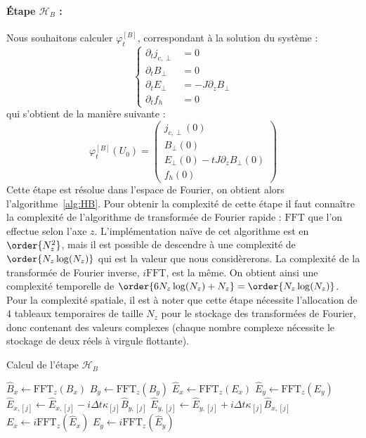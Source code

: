 \paragraph{Étape $\mathcal{H}_B$ :}
Nous souhaitons calculer $\varphi_t^{[B]}$, correspondant à la solution du système :
$$
  \begin{cases}
    \partial_t j_{c,\perp} &= 0 \\
    \partial_t B_\perp     &= 0 \\
    \partial_t E_\perp     &= -J\partial_zB_\perp \\
    \partial_t f_h         &= 0
  \end{cases}
$$
qui s'obtient de la manière suivante :
$$
  \varphi_t^{[B]}(U_0) = \begin{pmatrix}
    j_{c,\perp}(0) \\
    B_\perp(0) \\
    E_\perp(0) - tJ\partial_zB_\perp(0) \\
    f_h(0)
  \end{pmatrix}
$$
Cette étape est résolue dans l'espace de Fourier, on obtient alors l'algorithme~\ref{alg:HB}. Pour obtenir la complexité de cette étape il faut connaître la complexité de l'algorithme de transformée de Fourier rapide : $\text{FFT}$ que l'on effectue selon l'axe $z$. L'implémentation naïve de cet algorithme est en $\order{N_z^2}$, mais il est possible de descendre à une complexité de $\order{N_z\log(N_z)}$ qui est la valeur que nous considèrerons. La complexité de la transformée de Fourier inverse, $i\text{FFT}$, est la même. On obtient ainsi une complexité temporelle de $\order{6N_z\log(N_z)+N_z}=\order{N_z\log(N_z)}$. Pour la complexité spatiale, il est à noter que cette étape nécessite l'allocation de 4 tableaux temporaires de taille $N_z$ pour le stockage des transformées de Fourier, donc contenant des valeurs complexes (chaque nombre complexe nécessite le stockage de deux réels à virgule flottante).
\begin{algorithm}
  \caption{Calcul de l'étape $\mathcal{H}_{B}$}
  \label{alg:HB}
  \begin{algorithmic}[1]
      \State $\hat{B}_x \gets \text{FFT}_z(B_x)$
      \State $\hat{B}_y \gets \text{FFT}_z(B_y)$
      \State $\hat{E}_x \gets \text{FFT}_z(E_x)$
      \State $\hat{E}_y \gets \text{FFT}_z(E_y)$
        \State $\hat{E}_{x,[j]} \gets \hat{E}_{x,[j]} - i\Delta t \kappa_{[j]} \hat{B}_{y,[j]}$
        \State $\hat{E}_{y,[j]} \gets \hat{E}_{y,[j]} + i\Delta t \kappa_{[j]} \hat{B}_{x,[j]}$
      \EndFor
      \State $E_x \gets i\text{FFT}_z(\hat{E}_x)$
      \State $E_y \gets i\text{FFT}_z(\hat{E}_y)$
    \EndFunction
  \end{algorithmic}
\end{algorithm}

